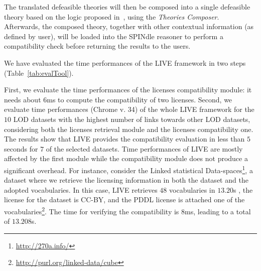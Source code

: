 The translated defeasible theories will then be composed into a single defeasible theory based on the logic proposed in~\cite{DBLP:conf/semweb/GovernatoriRVG13}, using the \textit{Theories Composer}. Afterwards, the composed theory, together with other contextual information (as defined by user), will be loaded into the SPINdle reasoner to perform a compatibility check before returning the results to the users.

We have evaluated the time performances of the LIVE framework in two steps (Table~\ref{tab:evalTool}).
\begin{table}[ht!]
\end{table}

First, we evaluate the time performances of the licenses compatibility module: it needs about 6ms to compute the compatibility of two licenses. Second, we evaluate time performances (Chrome v. 34) of the whole LIVE framework for the $10$ LOD datasets with the highest number of links towards other LOD datasets, considering both the licenses retrieval module and the licenses compatibility one. The results show that LIVE provides the compatibility evaluation in less than $5$ seconds for $7$ of the selected datasets. Time performances of LIVE are mostly affected by the first module while the compatibility module does not produce a significant overhead. For instance, consider the Linked statistical Data-spaces\footnote{\url{http://270a.info/}}, a dataset where we retrieve the licensing information in both the dataset and the adopted vocabularies. In this case, LIVE retrieves $48$ vocabularies in $13.20$s , the license for the dataset is CC-BY, and the PDDL license is attached one of the vocabularies\footnote{\url{http://purl.org/linked-data/cube}}. The time for verifying the compatibility is $8$ms, leading to a total of $13.208$s.

